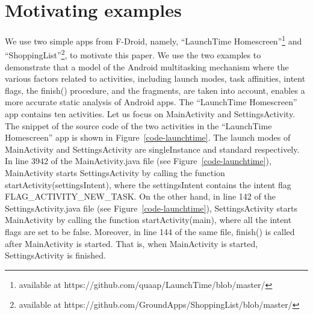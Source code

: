 \section{Motivating examples}\label{sec-motiv-exmp}
%
We use two simple apps from F-Droid, namely, ``LaunchTime Homescreen''\footnote{available at https://github.com/quaap/LaunchTime/blob/master/} and ``ShoppingList''\footnote{available at https://github.com/GroundApps/ShoppingList/blob/master/}, to motivate this paper. We use the two examples to demonstrate that a model of the Android multitasking mechanism where the various factors related to activities, including launch modes, task affinities, intent flags, the finish() procedure, and the fragments, are taken into account, enables a more accurate static analysis of Android apps.  
%
The ``LaunchTime Homescreen'' app contains ten activities. Let us focus on MainActivity and SettingsActivity. The snippet of the source code of the two activities in the ``LaunchTime Homescreen'' app is shown in Figure~\ref{code-launchtime}. The launch modes of MainActivity and SettingsActivity are singleInstance and standard respectively. 
In line 3942 of the MainActivity.java file (see Figure~\ref{code-launchtime}), MainActivity starts SettingsActivity by calling the function startActivity(settingsIntent), where the settingsIntent contains the intent flag FLAG\_ACTIVITY\_NEW\_TASK. 
On the other hand, in line 142 of the SettingsActivity.java file (see Figure~\ref{code-launchtime}), SettingsActivity starts MainActivity by calling the function startActivity(main), where all the intent flags are set to be false. Moreover, in line 144 of the same file, finish() is called after MainActivity is started. That is, when MainActivity is started, SettingsActivity is finished. 

